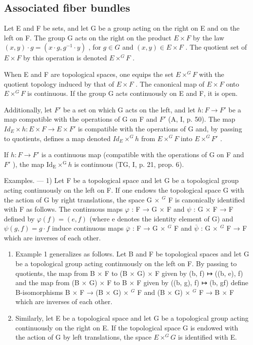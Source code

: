 \subsection{Associated fiber bundles}

Let E and F be sets, and let G be a group acting on the right on E and on the left on F. The group G acts on the right on the product \(E \times F\) by the law \((x, y) \cdot g = (x \cdot g, g^{-1} \cdot y)\) , for \(g \in G\) and \((x, y) \in E \times F\) . The quotient set of \(E \times F\) by this operation is denoted \(E \times^{G} F\) .

When E and F are topological spaces, one equips the set \(E \times^{G} F\) with the quotient topology induced by that of \(E \times F\) . The canonical map of \(E \times F\) onto \(E \times^{G} F\) is continuous. If the group G acts continuously on E and F, it is open.

Additionally, let \(F'\) be a set on which G acts on the left, and let \(h: F \to F'\) be a map compatible with the operations of G on F and \(F'\) (A, I, p. 50). The map \(Id_{E} \times h: E \times F \to E \times F'\) is compatible with the operations of G and, by passing to quotients, defines a map denoted \(Id_{E} \times^{G} h\) from \(E \times^{G} F\) into \(E \times^{G} F'\) .

If \(h \colon F \to F'\) is a continuous map (compatible with the operations of G on F and \(F'\) ), the map \(\mathrm{Id}_{\mathrm{E}} \times^{\mathrm{G}} h\) is continuous (TG, I, p. 21, prop. 6).

Examples. --- 1) Let F be a topological space and let G be a topological group acting continuously on the left on F. If one endows the topological space G with the action of G by right translations, the space G × \(^{G}\) F is canonically identified with F as follows. The continuous maps \(\varphi\) : F → G × F and \(\psi\) : G × F → F defined by \(\varphi(f) = (e, f)\) (where e denotes the identity element of G) and \(\psi(g, f) = g \cdot f\) induce continuous maps \(\overline{\varphi}\) : F → G × \(^{G}\) F and \(\overline{\psi}\) : G × \(^{G}\) F → F which are inverses of each other.

\begin{enumerate}
\def\labelenumi{\arabic{enumi})}
\setcounter{enumi}{1}
\item
  Example 1 generalizes as follows. Let B and F be topological spaces and let G be a topological group acting continuously on the left on F. By passing to quotients, the map from B × F to (B × G) × F given by (b, f) ↦ ((b, e), f) and the map from (B × G) × F to B × F given by ((b, g), f) ↦ (b, gf) define B-isomorphisms B × F → (B × G) × \(^{G}\) F and (B × G) × \(^{G}\) F → B × F which are inverses of each other.
\item
  Similarly, let E be a topological space and let G be a topological group acting continuously on the right on E. If the topological space G is endowed with the action of G by left translations, the space \(E \times^{G} G\) is identified with E.
\end{enumerate}


